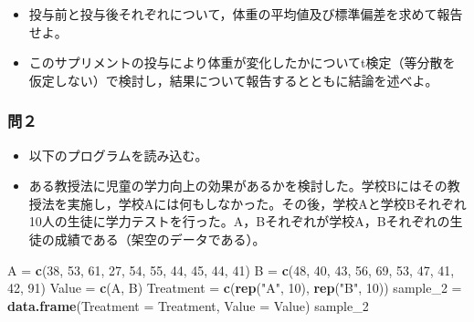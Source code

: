 \documentclass[]{article}
\newenvironment{Shaded}{\begin{snugshade}}{\end{snugshade}}
\newcommand{\KeywordTok}[1]{\textcolor[rgb]{0.13,0.29,0.53}{\textbf{#1}}}
\newcommand{\DataTypeTok}[1]{\textcolor[rgb]{0.13,0.29,0.53}{#1}}
\newcommand{\DecValTok}[1]{\textcolor[rgb]{0.00,0.00,0.81}{#1}}
\newcommand{\StringTok}[1]{\textcolor[rgb]{0.31,0.60,0.02}{#1}}
\newcommand{\NormalTok}[1]{#1}
\providecommand{\tightlist}{%
  \setlength{\itemsep}{0pt}\setlength{\parskip}{0pt}}
\begin{document}
\begin{itemize}
\tightlist
\item
  投与前と投与後それぞれについて，体重の平均値及び標準偏差を求めて報告せよ。\\
\item
  このサプリメントの投与により体重が変化したかについてt検定（等分散を仮定しない）で検討し，結果について報告するとともに結論を述べよ。
\end{itemize}

\subsubsection{問２}\label{-13}

\begin{itemize}
\item
  以下のプログラムを読み込む。
\item
  ある教授法に児童の学力向上の効果があるかを検討した。学校Bにはその教授法を実施し，学校Aには何もしなかった。その後，学校Aと学校Bそれぞれ10人の生徒に学力テストを行った。A，Bそれぞれが学校A，Bそれぞれの生徒の成績である（架空のデータである）。
\end{itemize}

\begin{Shaded}
\begin{Highlighting}[]
\NormalTok{A =}\StringTok{ }\KeywordTok{c}\NormalTok{(}\DecValTok{38}\NormalTok{, }\DecValTok{53}\NormalTok{, }\DecValTok{61}\NormalTok{, }\DecValTok{27}\NormalTok{, }\DecValTok{54}\NormalTok{, }\DecValTok{55}\NormalTok{, }\DecValTok{44}\NormalTok{, }\DecValTok{45}\NormalTok{, }\DecValTok{44}\NormalTok{, }\DecValTok{41}\NormalTok{)}
\NormalTok{B =}\StringTok{ }\KeywordTok{c}\NormalTok{(}\DecValTok{48}\NormalTok{, }\DecValTok{40}\NormalTok{, }\DecValTok{43}\NormalTok{, }\DecValTok{56}\NormalTok{, }\DecValTok{69}\NormalTok{, }\DecValTok{53}\NormalTok{, }\DecValTok{47}\NormalTok{, }\DecValTok{41}\NormalTok{, }\DecValTok{42}\NormalTok{, }\DecValTok{91}\NormalTok{)}
\NormalTok{Value =}\StringTok{ }\KeywordTok{c}\NormalTok{(A, B)}
\NormalTok{Treatment =}\StringTok{ }\KeywordTok{c}\NormalTok{(}\KeywordTok{rep}\NormalTok{(}\StringTok{"A"}\NormalTok{, }\DecValTok{10}\NormalTok{), }\KeywordTok{rep}\NormalTok{(}\StringTok{"B"}\NormalTok{, }\DecValTok{10}\NormalTok{))}
\NormalTok{sample_}\DecValTok{2}\NormalTok{ =}\StringTok{ }\KeywordTok{data.frame}\NormalTok{(}\DataTypeTok{Treatment =}\NormalTok{ Treatment, }\DataTypeTok{Value =}\NormalTok{ Value)}
\NormalTok{sample_}\DecValTok{2}
\end{Highlighting}
\end{Shaded}
\end{document}
